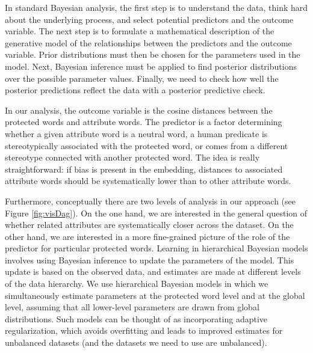 \documentclass{clv3}
\begin{document}
In standard Bayesian analysis, the first step is to understand the
data, think hard about the underlying process, and select potential
predictors and the outcome variable. The next step is to formulate a
mathematical description of the generative model of the relationships
between the predictors and the outcome variable. Prior distributions
must then be chosen for the parameters used in the model. Next, Bayesian
inference must be applied to find posterior distributions over the
possible parameter values. Finally, we need to check how well the
posterior predictions reflect the data with a posterior predictive
check.

In our analysis, the outcome variable is the cosine distances between the
protected words and attribute words. The predictor is a factor
determining whether a given attribute word is a neutral word, a human
predicate is stereotypically associated with the protected word, or
comes from a different stereotype connected with another protected word.
The idea is really straightforward: if bias is present in the embedding,
distances to associated attribute words should be systematically lower
than to other attribute words.

Furthermore, conceptually there are two levels of analysis in our
approach (see Figure \ref{fig:visDag}). On the one hand, we are
interested in the general question of whether related attributes are
systematically closer across the dataset. On the other hand, we are
interested in a more fine-grained picture of the role of the predictor
for particular protected words. Learning in hierarchical Bayesian models
involves using Bayesian inference to update the parameters of the model.
This update is based on the observed data, and estimates are made at
different levels of the data hierarchy. We use hierarchical Bayesian
models in which we simultaneously estimate parameters at the protected
word level and at the global level, assuming that all lower-level
parameters are drawn from global distributions. Such models can be
thought of as incorporating adaptive regularization, which avoids
overfitting and leads to improved estimates for unbalanced datasets (and
the datasets we need to use are unbalanced).
\end{document}
